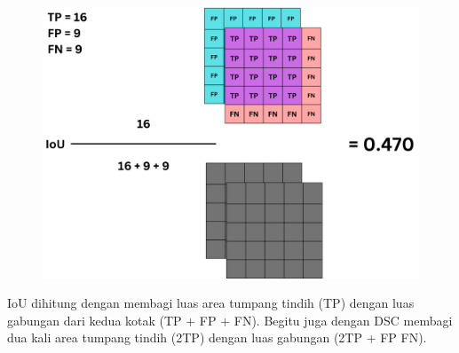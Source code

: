   \begin{figure}[H]
 	\centering
 	\includegraphics[scale=.2]{gambar/lampiran/IoU.png}
 \end{figure} 
 
 IoU dihitung dengan membagi luas area tumpang tindih (TP) dengan luas gabungan dari kedua kotak (TP + FP + FN). Begitu juga dengan DSC membagi dua kali area tumpang tindih (2TP) dengan luas gabungan (2TP + FP FN). 
 


